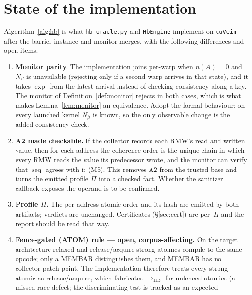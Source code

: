 \documentclass[11pt]{article}
\theoremstyle{remark}
\DeclareMathOperator{\seq}{seq}
\newcommand{\HB}{\to_{\mathrm{HB}}}
\begin{document}
\section{State of the implementation}\label{sec:impl}

Algorithm~\ref{alg:hb} is what \texttt{hb\_oracle.py} and \texttt{HbEngine}
implement on \texttt{cuVein} after the barrier-instance and monitor merges,
with the following differences and open items.

\begin{enumerate}
\item \textbf{Monitor parity.} The implementation joins per-warp when
      $n(A)=0$ and $N_\beta$ is unavailable (rejecting only if a second warp
      arrives in that state), and it takes $\exp$ from the latest arrival
      instead of checking consistency along a key. The monitor of
      Definition~\ref{def:monitor} rejects in both cases, which is what makes
      Lemma~\ref{lem:monitor} an equivalence. Adopt the formal behaviour; on
      every launched kernel $N_\beta$ is known, so the only observable change
      is the added consistency check.
\item \textbf{A2 made checkable.} If the collector records each RMW's read and
      written value, then for each address the coherence order is the unique
      chain in which every RMW reads the value its predecessor wrote, and the
      monitor can verify that $\seq$ agrees with it (M5). This removes A2 from
      the trusted base and turns the emitted profile $\Pi$ into a checked
      fact. Whether the sanitizer callback exposes the operand is to be
      confirmed.
\item \textbf{Profile $\Pi$.} The per-address atomic order and its hash are
      emitted by both artifacts; verdicts are unchanged. Certificates
      (\S\ref{sec:cert}) are per~$\Pi$ and the report should be read that way.
\item \textbf{Fence-gated (ATOM) rule --- open, corpus-affecting.} On the
      target architecture relaxed and release/acquire strong atomics compile to
      the same opcode; only a MEMBAR distinguishes them, and MEMBAR has no
      collector patch point. The implementation therefore treats every strong
      atomic as release/acquire, which fabricates $\HB$ for unfenced atomics
      (a missed-race defect; the discriminating test is tracked as an expected

\end{enumerate}
\end{document}

